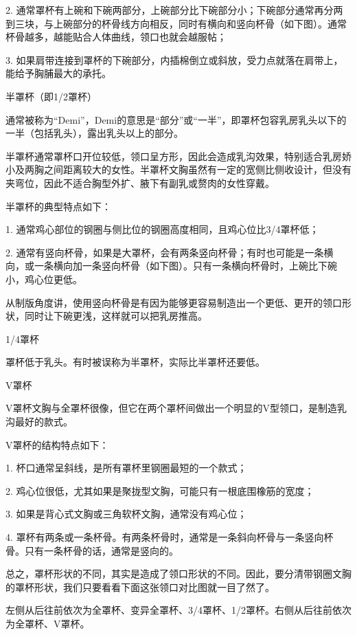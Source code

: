 \documentclass[12pt,UTF8]{ctexbook}
\begin{document}
2. 通常罩杯有上碗和下碗两部分，上碗部分比下碗部分小；下碗部分通常再分两到三块，与上碗部分的杯骨线方向相反，同时有横向和竖向杯骨（如下图）。通常杯骨越多，越能贴合人体曲线，领口也就会越服帖；

3. 如果肩带连接到罩杯的下碗部分，内插棉倒立或斜放，受力点就落在肩带上，能给予胸脯最大的承托。



半罩杯（即1/2罩杯）

通常被称为“Demi”，Demi的意思是“部分”或“一半”，即罩杯包容乳房乳头以下的一半（包括乳头），露出乳头以上的部分。

半罩杯通常罩杯口开位较低，领口呈方形，因此会造成乳沟效果，特别适合乳房娇小及两胸之间距离较大的女性。半罩杯文胸虽然有一定的宽侧比侧收设计，但没有夹弯位，因此不适合胸型外扩、腋下有副乳或赘肉的女性穿戴。


半罩杯的典型特点如下：

1. 通常鸡心部位的钢圈与侧比位的钢圈高度相同，且鸡心位比3/4罩杯低；

2. 通常有竖向杯骨，如果是大罩杯，会有两条竖向杯骨；有时也可能是一条横向，或一条横向加一条竖向杯骨（如下图）。只有一条横向杯骨时，上碗比下碗小，鸡心位更低。

从制版角度讲，使用竖向杯骨是有因为能够更容易制造出一个更低、更开的领口形状，同时让下碗更浅，这样就可以把乳房推高。



1/4罩杯

罩杯低于乳头。有时被误称为半罩杯，实际比半罩杯还要低。



V罩杯

V罩杯文胸与全罩杯很像，但它在两个罩杯间做出一个明显的V型领口，是制造乳沟最好的款式。


V罩杯的结构特点如下：

1. 杯口通常呈斜线，是所有罩杯里钢圈最短的一个款式；

2. 鸡心位很低，尤其如果是聚拢型文胸，可能只有一根底围橡筋的宽度；

3. 如果是背心式文胸或三角软杯文胸，通常没有鸡心位；

4. 罩杯有两条或一条杯骨。有两条杯骨时，通常是一条斜向杯骨与一条竖向杯骨。只有一条杯骨的话，通常是竖向的。



总之，罩杯形状的不同，其实是造成了领口形状的不同。因此，要分清带钢圈文胸的罩杯形状，我们只要看看下面这张领口对比图就一目了然了。

左侧从后往前依次为全罩杯、变异全罩杯、3/4罩杯、1/2罩杯。右侧从后往前依次为全罩杯、V罩杯。
\end{document}
